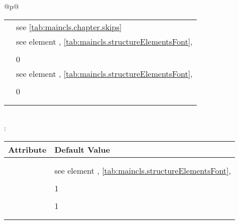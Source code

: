 \begin{longtable}{@{}p{\columnwidth}@{}}
\begin{tabularx}{\linewidth}{ll}
    \PValue{beforeskip}  & see \autoref{tab:maincls.chapter.skips} \\
    \PValue{font}        & see element \DescRef{maincls.fontelement.chapter},
                           \autoref{tab:maincls.structureElementsFont}, 
                           \autopageref{tab:maincls.structureElementsFont} \\
    \PValue{innerskip}   & \PValue{0.5\Length{baselineskip}} \\
    \PValue{level}       & 0 \\
    \PValue{prefixfont}  & see element 
                           \DescRef{maincls.fontelement.chapterprefix},
                           \autoref{tab:maincls.structureElementsFont}, 
                           \autopageref{tab:maincls.structureElementsFont} \\
    \PValue{tocindent}   & \PValue{0pt} \\
    \PValue{toclevel}    & 0 \\
    \PValue{tocnumwidth} & \PValue{1.5em} \\
    \PValue{tocstyle}    & \PValue{chapter} \\
    \bottomrule
    \end{tabularx} \\
    \addlinespace[\normalbaselineskip]
    : \\*
    \begin{tabularx}{\linewidth}{ll}
    \toprule
    Attribute & Default Value \\
    \midrule
    \PValue{afterskip}   & \PValue{2.3ex plus .2ex} \\
    \PValue{beforeskip}  & \PValue{-3.5ex plus -1ex minus -.2ex} \\
    \PValue{font}        & see element \DescRef{maincls.fontelement.section},
                           \autoref{tab:maincls.structureElementsFont}, 
                           \autopageref{tab:maincls.structureElementsFont} \\
    \PValue{indent}      & \PValue{0pt} \\
    \PValue{level}       & 1 \\
    \PValue{tocindent}   & \PValue{1.5em}\\
    \PValue{toclevel}    & 1 \\
    \PValue{tocnumwidth} & \PValue{2.3em}\\
    \PValue{tocstyle}    & \PValue{section} \\
    \bottomrule
    \end{tabularx} \\

\end{longtable}
